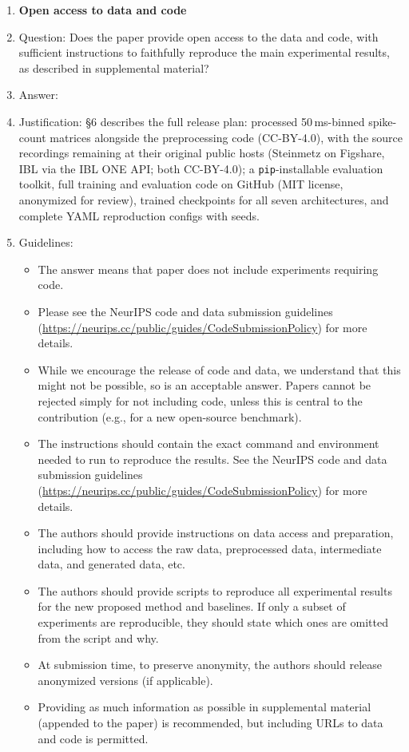 \begin{enumerate}
\item {\bf Open access to data and code}
    \item[] Question: Does the paper provide open access to the data and code, with sufficient instructions to faithfully reproduce the main experimental results, as described in supplemental material?
    \item[] Answer: \answerYes{}
    \item[] Justification: \S6 describes the full release plan:
      processed 50\,ms-binned spike-count matrices alongside the
      preprocessing code (CC-BY-4.0), with the source recordings
      remaining at their original public hosts (Steinmetz on
      Figshare, IBL via the IBL ONE API; both CC-BY-4.0); a
      \texttt{pip}-installable evaluation toolkit, full training
      and evaluation code on GitHub (MIT license, anonymized for
      review), trained checkpoints for all seven architectures, and
      complete YAML reproduction configs with seeds.
    \item[] Guidelines:
    \begin{itemize}
        \item The answer \answerNA{} means that paper does not include experiments requiring code.
        \item Please see the NeurIPS code and data submission guidelines (\url{https://neurips.cc/public/guides/CodeSubmissionPolicy}) for more details.
        \item While we encourage the release of code and data, we understand that this might not be possible, so \answerNo{} is an acceptable answer. Papers cannot be rejected simply for not including code, unless this is central to the contribution (e.g., for a new open-source benchmark).
        \item The instructions should contain the exact command and environment needed to run to reproduce the results. See the NeurIPS code and data submission guidelines (\url{https://neurips.cc/public/guides/CodeSubmissionPolicy}) for more details.
        \item The authors should provide instructions on data access and preparation, including how to access the raw data, preprocessed data, intermediate data, and generated data, etc.
        \item The authors should provide scripts to reproduce all experimental results for the new proposed method and baselines. If only a subset of experiments are reproducible, they should state which ones are omitted from the script and why.
        \item At submission time, to preserve anonymity, the authors should release anonymized versions (if applicable).
        \item Providing as much information as possible in supplemental material (appended to the paper) is recommended, but including URLs to data and code is permitted.
    \end{itemize}



\end{enumerate}
